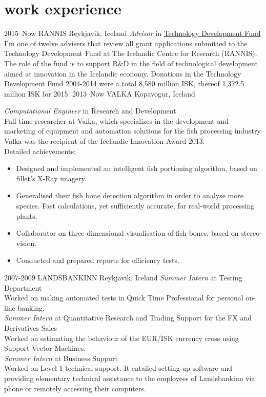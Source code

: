 \documentclass[]{cv} %
\begin{document}
\section{work experience}


\begin{entrylist}
\entry
{2015--Now}
{RANNIS}
{Reykjavik, Iceland}
{\emph{Advisor} in 
\href{http://www.rannis.is/sjodir/rannsoknir/taeknithrounarsjodur/fagrad/}{Technology
 Development Fund}\\
I'm one of twelve advisers that review all grant applications submitted to the  
Technology Development Fund at The Icelandic Centre for Research (RANNIS).
The role of the fund is to support R$\&$D in the field of technological 
development aimed at innovation in the Icelandic economy.
Donations in the Technology Development Fund 2004-2014 were a total 8,580 
million ISK, thereof 1,372.5 million ISK for 2015.
}
\entry
{2013--Now}
{VALKA}
{Kopavogur, Iceland}
{\emph{Computational Engineer} in Research and Development \\
Full time researcher at Valka, which specializes in the development and marketing of equipment and automation solutions for the fish processing industry. Valka was the recipient of the Icelandic Innovation Award 2013. \\
Detailed achievements:
\begin{itemize}
\item Designed and implemented an intelligent fish portioning algorithm, based 
on fillet's X-Ray imagery. 
\item Generalised their fish bone detection algorithm in order to analyse more species. Fast calculations, yet sufficiently accurate, for real-world processing plants.
\item Collaborator on three dimensional visualisation of fish bones, based on stereo-vision.
\item Conducted and prepared reports for efficiency tests.
\end{itemize}
}
\entry
{2007-2009}
{LANDSBANKINN}
{Reykjavik, Iceland}
{
\emph{Summer Intern} at Testing Department \\ Worked on making automated tests 
in Quick Time Professional for personal on-line banking. 
\\
\emph{Summer Intern} at Quantitative Research and Trading Support for the FX and Derivatives Sales \\ Worked on estimating the behaviour of the EUR/ISK currency cross using Support Vector Machines.
\\
\emph{Summer Intern} at Business Support \\ Worked on Level 1 technical support. It entailed setting up software and providing elementary technical assistance to the employees of Landsbankinn via phone or remotely accessing their computers.
}
\end{entrylist}
\end{document}
